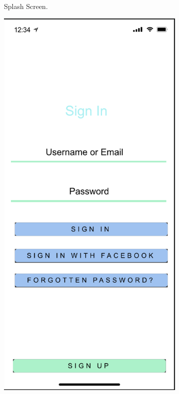 \begin{figure}[H]
\begin{subfigure}[b]{0.3\textwidth}
        \caption{Splash Screen.}
        \label{fig:start_colour}
    \end{subfigure}
    \hfill
    \begin{subfigure}[b]{0.3\textwidth}
        \centering
        \includegraphics[width=\textwidth]{./graphics/design/Sign In Colour.png}

\end{subfigure}
\end{figure}
